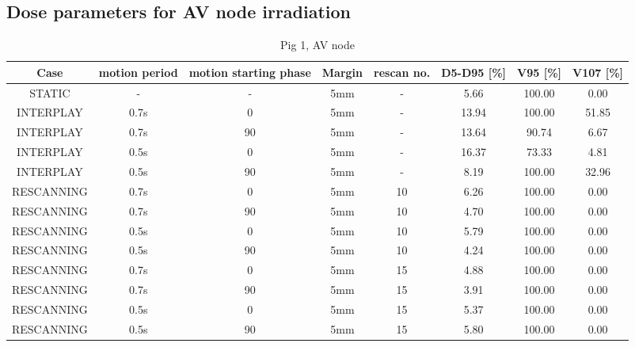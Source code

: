 \documentclass[type=dr, dr=rernat, accentcolor=tud7b,colorbacktitle, bigchapter, openright, twoside, 12pt ]{tudthesis}
\begin{document}
\newpage

\subsection*{Dose parameters for AV node irradiation}

\vspace*{-0.4cm}

\begin{table}[H]
  \centering
  \tiny
  \caption{Pig 1, AV node}
  \begin{tabular}{|c||c|c|c|c||c|c|c|}
    \hline\hline
    Case & motion period & motion starting phase & Margin & rescan no. & D5-D95 [\%] & V95 [\%] & V107 [\%] \\
    \hline 
STATIC & - & - & 5mm & - & 5.66 & 100.00 & 0.00\\
INTERPLAY & 0.7s & 0 & 5mm & - & 13.94 & 100.00 & 51.85\\
INTERPLAY & 0.7s & 90 & 5mm & - & 13.64 & 90.74 & 6.67\\
INTERPLAY & 0.5s & 0 & 5mm & - & 16.37 & 73.33 & 4.81\\
INTERPLAY & 0.5s & 90 & 5mm & - & 8.19 & 100.00 & 32.96\\
RESCANNING & 0.7s & 0 & 5mm & 10 & 6.26 & 100.00 & 0.00\\
RESCANNING & 0.7s & 90 & 5mm & 10 & 4.70 & 100.00 & 0.00\\
RESCANNING & 0.5s & 0 & 5mm & 10 & 5.79 & 100.00 & 0.00\\
RESCANNING & 0.5s & 90 & 5mm & 10 & 4.24 & 100.00 & 0.00\\
RESCANNING & 0.7s & 0 & 5mm & 15 & 4.88 & 100.00 & 0.00\\
RESCANNING & 0.7s & 90 & 5mm & 15 & 3.91 & 100.00 & 0.00\\
RESCANNING & 0.5s & 0 & 5mm & 15 & 5.37 & 100.00 & 0.00\\
RESCANNING & 0.5s & 90 & 5mm & 15 & 5.80 & 100.00 & 0.00\\
    \hline\hline 
  \end{tabular}
  \label{tab:Pig1_AV}
\end{table}

\vspace*{-0.4cm}
\end{document}
